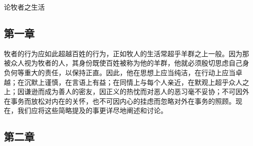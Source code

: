 论牧者之生活\par


\subsection{第一章}

\par

牧者的行为应如此超越百姓的行为，正如牧人的生活常超乎羊群之上一般。因为那被众人视为牧者的人，其身份既使百姓被称为他的羊群，他就必须殷切思虑自己身负何等重大的责任，以保持正直。因此，他在思想上应当纯洁，在行动上应当卓越；在沉默上谨慎，在言语上有益；在同情上与每个人亲近，在默观上超乎众人之上；因谦逊而成为善人的密友，因正义的热忱而对恶人的恶习毫不妥协；不可因外在事务而放松对内在的关怀，也不可因内心的挂虑而忽略对外在事务的照顾。现在，我们应将这些简略提及的事更详尽地阐述和讨论。\par


\subsection{第二章}

\par

